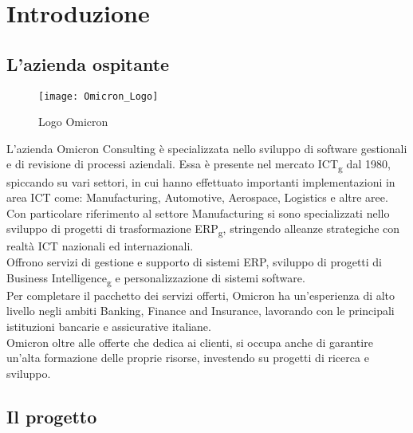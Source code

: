 \chapter{Introduzione}
\label{cap:introduzione}

\section{L'azienda ospitante}

\begin{figure}[!h] 
    \centering 
    \texttt{[image: Omicron\_Logo]} 
    \caption{Logo Omicron}
\end{figure}

\noindent L’azienda Omicron Consulting è specializzata nello sviluppo di software gestionali e di revisione di processi aziendali. Essa è presente nel mercato ICT\textsubscript{g} dal 1980, spiccando su vari settori, in cui hanno effettuato importanti implementazioni in area ICT come:  Manufacturing, Automotive, Aerospace, Logistics e altre aree.
Con particolare riferimento al settore Manufacturing si sono specializzati nello sviluppo di progetti di trasformazione ERP\textsubscript{g}, stringendo alleanze strategiche con realtà ICT nazionali ed internazionali.\\
Offrono servizi di gestione e supporto di sistemi ERP, sviluppo di progetti di Business Intelligence\textsubscript{g} e personalizzazione di sistemi software.\\
Per completare il pacchetto dei servizi offerti, Omicron ha un'esperienza di alto livello negli ambiti Banking, Finance and Insurance, lavorando con le principali istituzioni bancarie e assicurative italiane.\\
Omicron oltre alle offerte che dedica ai clienti, si occupa anche di garantire un'alta formazione delle proprie risorse, investendo su progetti di ricerca e sviluppo.

\section{Il progetto}
